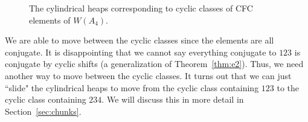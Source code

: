 \begin{example}
\begin{center} \begin{figure}[H] \centering
\begin{subfigure}{0.3\textwidth} \centering
{}
\caption{}\label{fig:cylheap123}
\end{subfigure}
\begin{subfigure}{0.3\textwidth} \centering
{}
\caption{}\label{fig:cylheap234}
\end{subfigure}
\caption{The cylindrical heaps corresponding to cyclic classes of CFC elements of $W(A_4)$.}\label{fig:cylheaps123and234}
\end{figure} \end{center}
    
    We are able to move between the cyclic classes since the elements are all conjugate. It is disappointing that we cannot say everything conjugate to $123$ is conjugate by cyclic shifts (a generalization of Theorem~\ref{thm:e2}). Thus, we need another way to move between the cyclic classes.
    It turns out that we can just ``slide" the cylindrical heaps to move from the cyclic class containing $123$ to the cyclic class containing $234$. We will discuss this in more detail in Section~\ref{sec:chunks}.


\end{example}
